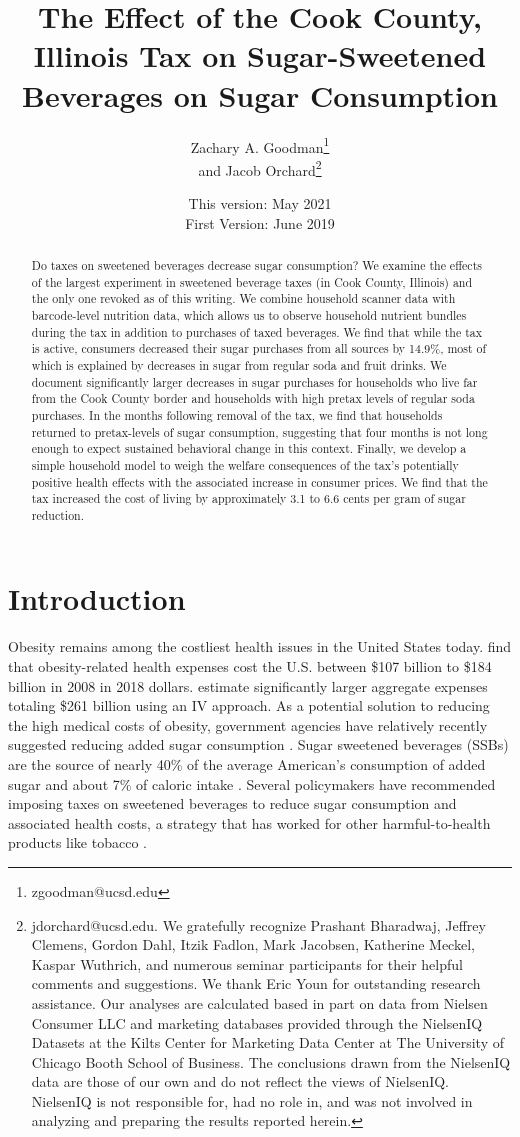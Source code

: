 \documentclass[12pt]{article}
\title{The Effect of the Cook County, Illinois Tax on Sugar-Sweetened Beverages on Sugar Consumption}
\author{Zachary A. Goodman\thanks{zgoodman@ucsd.edu}\\ and Jacob Orchard\thanks{jdorchard@ucsd.edu. We gratefully recognize Prashant Bharadwaj, Jeffrey Clemens, Gordon Dahl, Itzik Fadlon, Mark Jacobsen, Katherine Meckel, Kaspar Wuthrich, and numerous seminar participants for their helpful comments and suggestions. We thank Eric Youn for outstanding research assistance. Our analyses are calculated based in part on data from Nielsen Consumer LLC and marketing databases provided through the NielsenIQ Datasets at the Kilts Center for Marketing Data Center at The University of Chicago Booth School of Business. The conclusions drawn from the NielsenIQ data are those of our own and do not reflect the views of NielsenIQ. NielsenIQ is not responsible for, had no role in, and was not involved in analyzing and preparing the results reported herein.}}
\affil{University of California, San Diego}
\date{This version: May 2021\\
First Version: June 2019}
\begin{document}
\maketitle

\begin{abstract}

Do taxes on sweetened beverages decrease sugar consumption? We examine the effects of the largest experiment in sweetened beverage taxes (in Cook County, Illinois) and the only one revoked as of this writing. We combine household scanner data with barcode-level nutrition data, which allows us to observe household nutrient bundles during the tax in addition to purchases of taxed beverages. We find that while the tax is active, consumers decreased their sugar purchases from all sources by 14.9\%, most of which is explained by decreases in sugar from regular soda and fruit drinks. We document significantly larger decreases in sugar purchases for households who live far from the Cook County border and households with high pretax levels of regular soda purchases. In the months following removal of the tax, we find that households returned to pretax-levels of sugar consumption, suggesting that four months is not long enough to expect sustained behavioral change in this context. Finally, we develop a simple household model to weigh the welfare consequences of the tax's potentially positive health effects with the associated increase in consumer prices. We find that the tax increased the cost of living by approximately 3.1 to 6.6 cents per gram of sugar reduction.
\end{abstract}

\pagebreak

\doublespacing

\section{Introduction} \label{introduction}

Obesity remains among the costliest health issues in the United States today. \textcite{finkelstein2009annual} find that obesity-related health expenses cost the U.S. between \$107 billion to \$184 billion in 2008 in 2018 dollars. \textcite{cawley2012medical} estimate significantly larger aggregate expenses totaling \$261 billion using an IV approach. As a potential solution to reducing the high medical costs of obesity, government agencies have relatively recently suggested reducing added sugar consumption \parencite{dietary2015dietary}. Sugar sweetened beverages (SSBs) are the source of nearly 40\% of the average American's consumption of added sugar \parencite{dietary2015dietary} and about 7\% of caloric intake \parencite{allcott2019should}. Several policymakers have recommended imposing taxes on sweetened beverages to reduce sugar consumption and associated health costs, a strategy that has worked for other harmful-to-health products like tobacco \parencite{chaloupka2012tobacco}.
\end{document}
